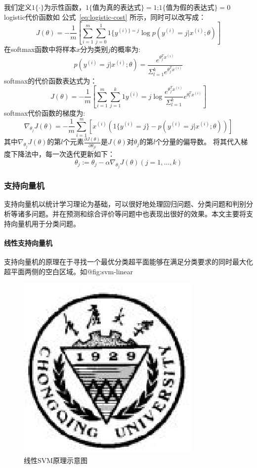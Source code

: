 \documentclass[bachelor,zhspacing]{cqu}  %
\begin{document}
我们定义\(1\{\cdot\}\)为示性函数，\(1\{\textrm{值为真的表达式}\}=1\);\(1\{\textrm{值为假的表达式}\}=0\)
logistic代价函数如 公式~\ref{eq:logistic-cost} 所示，同时可以改写成：
\[J(\theta) = -\frac{1}{m}[\sum_{i=1}^{m}\sum_{j=0}^{1}1\{y^{(i)\}=j}\log p(y^{(i)} = j|x^{(i)};\theta)]\]
在softmax函数中将样本\(x\)分为类别\(j\)的概率为:
\[p(y^{(i)}=j|x^{(i)};\theta)=\frac{e^{\theta_{j}^{T}x^{(i)}}}{\Sigma_{l=1}^{k}e^{\theta_{j}^{T}x^{(i)}}}\]
softmax的代价函数表达式为：
\[J(\theta)= -\frac{1}{m}[\sum_{i=1}^{m}\sum_{j=1}^{k}1{y^{(i)}=j}\log \frac{e^{\theta_{j}^{T}x^{(i)}}}{\Sigma_{l=1}^{k}}e^{\theta_{l}^{T}x^{(i)}}]\]
softmax代价函数的梯度为:
\[\nabla_{\theta_{j}}J(\theta) = -\frac{1}{m}\sum_{i=1}^{m}[x^{(i)}(1\{y^{(i)}=j\}-p(y^{(i)}=j|x^{(i)};\theta))]\]
其中\(\nabla_{\theta_{j}}J(\theta)\)的第\(l\)个元素\(\frac{\partial J(\theta)}{\partial\theta_{jl}}\)是\(J(\theta)\)对\(\theta_{j}\)的第\(l\)个分量的偏导数。
将其代入梯度下降法中，每一次迭代更新如下：
\[\theta_{j}:=\theta_{j}-\alpha\nabla_{\theta_{j}}J(\theta)(j=1,\ldots,k)\]

\subsubsection{支持向量机}\label{ux652fux6301ux5411ux91cfux673a}

支持向量机以统计学习理论为基础，可以很好地处理回归问题、分类问题和判别分析等诸多问题。并在预测和综合评价等问题中也表现出很好的效果。本文主要将支持向量机用于分类问题。

\paragraph{线性支持向量机}\label{ux7ebfux6027ux652fux6301ux5411ux91cfux673a}

支持向量机的原理在于寻找一个最优分类超平面能够在满足分类要求的同时最大化超平面两侧的空白区域。如@fig:svm-linear

\begin{figure}[htbp]
\centering
\includegraphics{./pic/cqu.eps}
\caption{线性SVM原理示意图}\label{fig:svm-linear}
\end{figure}
\end{document}
